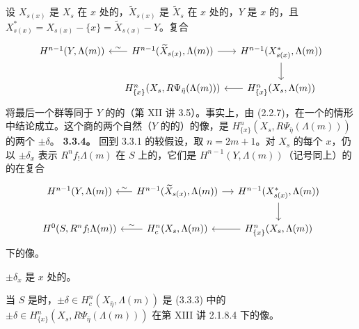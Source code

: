 设 $X_{s(x)}$ 是 $X_s$ 在 $x$ 处的，$\widetilde X_{s(x)}$ 是 $\widetilde X_s$ 在 $x$ 处的，$Y$ 是 $x$ 的，且 $X^*_{s(x)}=X_{s(x)}-\{x\}=\widetilde X_{s(x)}-Y$。复合
\[
\begin{tikzcd}[column sep=small]
H^{n-1}(Y,\Lambda(m))&H^{n-1}(\widetilde X_{s(x)},\Lambda(m))\arrow[l,"\sim"']\arrow[r]&H^{n-1}(X^*_{s(x)},\Lambda(m))\arrow[d]\\
&H^n_{\{x\}}(X_s,R\Psi_{\bar\eta}(\Lambda(m)))&H^n_{\{x\}}(X_s,\Lambda(m))\arrow[l]
\end{tikzcd}
\]
将最后一个群等同于 $Y$ 的的（第 XII 讲 3.5）。事实上，由 (2.2.7)，在一个的情形中结论成立。这个商的两个自然（$Y$ 的的）的像，是 $H^n_{\{x\}}(X_s,R\Psi_{\bar\eta}(\Lambda(m)))$ 的两个 $\pm\delta$。
\textbf{3.3.4。} 回到 3.3.1 的较假设，取 $n=2m+1$。对 $X_s$ 的每个 $x$，仍以 $\pm\delta_x$ 表示 $R^nf_!\Lambda(m)$ 在 $S$ 上的，它们是 $H^{n-1}(Y,\Lambda(m))$（记号同上）的的在复合
\[
\begin{tikzcd}[column sep=small]
H^{n-1}(Y,\Lambda(m))&H^{n-1}(\widetilde X_{s(x)},\Lambda(m))\arrow[l,"\sim"']\arrow[r]&H^{n-1}(X^*_{s(x)},\Lambda(m))\arrow[d]\\
H^0(S,R^nf_!\Lambda(m))&H_c^n(X_s,\Lambda(m))\arrow[l,"\sim"']&H^n_{\{x\}}(X_s,\Lambda(m))\arrow[l]
\end{tikzcd}
\]
下的像。

$\pm\delta_x$ 是 $x$ 处的。

当 $S$ 是时，$\pm\delta\in H_c^n(X_{\bar\eta},\Lambda(m))$ 是 (3.3.3) 中的 $\pm\delta\in H^n_{\{x\}}(X_s,R\Psi_{\bar\eta}(\Lambda(m)))$ 在第 XIII 讲 2.1.8.4 下的像。

